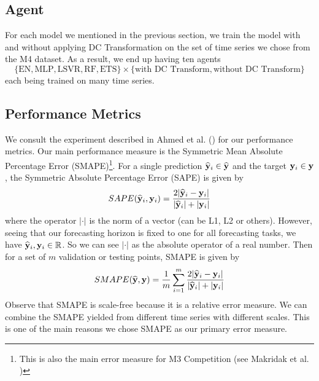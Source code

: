 \subsection{Agent}
For each model we mentioned in the previous section, we train the model with and without applying DC Transformation on the set of time series we chose from the M4 dataset. As a result, we end up having ten agents
\begin{equation*}
    \{\text{EN}, \text{MLP}, \text{LSVR}, \text{RF}, \text{ETS} \} \times \{ \text{with DC Transform}, \text{without DC Transform} \}
\end{equation*}
each being trained on many time series.

\subsection{Performance Metrics}
We consult the experiment described in Ahmed et al. (\citeyear{2010EmpiricalMLComparison}) for our performance metrics. Our main performance measure is the Symmetric Mean Absolute Percentage Error (SMAPE)\footnote{This is also the main error measure for M3 Competition (see Makridak et al. \citeyear{makridakis2000m3})}. For a single prediction $\widehat{\mathbf{y}}_i \in \widehat{\mathbf{y}}$ and the target $\mathbf{y}_i \in \mathbf{y}$, the Symmetric Absolute Percentage Error (SAPE) is given by
\begin{equation*}
    SAPE(\widehat{\mathbf{y}}_i, \mathbf{y}_i) = \frac{2| \widehat{\mathbf{y}}_i - \mathbf{y}_i|}{|\widehat{\mathbf{y}}_i| + |\mathbf{y}_i| }
\end{equation*}
where the operator $| \cdot |$ is the norm of a vector (can be L1, L2 or others). However, seeing that our forecasting horizon is fixed to one for all forecasting tasks, we have $\widehat{\mathbf{y}}_i, \mathbf{y}_i \in \mathbb{R}$. So we can see $| \cdot |$ as the absolute operator of a real number. Then for a set of $m$ validation or testing points, SMAPE is given by
\begin{equation*}
    SMAPE(\widehat{\mathbf{y}}, \mathbf{y}) = \frac{1}{m} \sum_{i=1}^{m} \frac{2| \widehat{\mathbf{y}}_i - \mathbf{y}_i|}{|\widehat{\mathbf{y}}_i| + |\mathbf{y}_i| }
\end{equation*}
Observe that SMAPE is scale-free because it is a relative error measure. We can combine the SMAPE yielded from different time series with different scales. This is one of the main reasons we chose SMAPE as our primary error measure.

